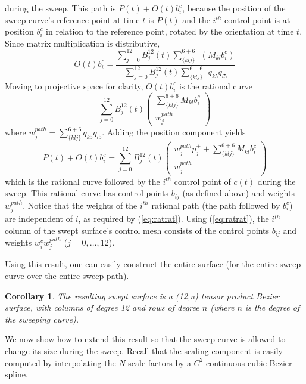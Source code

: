 \documentclass[times]{article}
\newcommand{\QED}{\vrule height 1.4ex width 1.0ex depth -.1ex\ } %
\newtheorem{corollary}{Corollary}[section]
\begin{document}
during the sweep.
This path is $P(t) + O(t)b_i^{c}$, because the position of the sweep
curve's reference point at time $t$ is $P(t)$ and the $i^{th}$ control
point is at position $b_i^c$ in relation to the reference point, rotated
by the orientation at time $t$.
Since matrix multiplication is distributive,
\[
	O(t)b_i^{c} = 
\frac{\sum_{j=0}^{12} B_j^{12}(t) \sum_{\{klj\}}^{6+6}
	\ \ (M_{kl} b_i^{c}) }
     {\sum_{j=0}^{12} B_j^{12}(t) \sum_{\{klj\}}^{6+6} 
	\ \ q_{k5}q_{l5}}
\]
Moving to projective space for clarity, 
$O(t)b_i^{c}$ is the rational curve
\[
	\sum_{j=0}^{12} B_j^{12}(t) 
	\left(	\begin{array}{c}
	\sum_{\{klj\}}^{6+6} M_{kl} b_i^{c} \\ w_j^{path}
	\end{array} \right)
\]
where $w_j^{path} = \sum_{\{klj\}}^{6+6} q_{k5} q_{l5}$.
Adding the position component yields
\[
P(t) + O(t)b_i^{c} = 
	\sum_{j=0}^{12} B_j^{12}(t) 
	\left(	\begin{array}{c}
	w_j^{path} p_j^{+} + \sum_{\{klj\}}^{6+6} M_{kl} b_i^{c} \\ 
	w_j^{path}
	\end{array} \right)
\]
which is the rational curve followed by the $i^{th}$ control point
of $c(t)$ during the sweep.
This rational curve has control points $b_{ij}$ (as defined above)
and weights $w_j^{path}$.
Notice that the weights of the $i^{th}$ rational path 
(the path followed by $b_i^c$) are 
independent of $i$, as required by (\ref{eq:ratrat}).
Using (\ref{eq:ratrat}), 
the $i^{th}$ column of the swept surface's control mesh consists
of the control points $b_{ij}$
and weights $w_i^{c} w_j^{path}$ ($j=0,\ldots,12$).
\QED

Using this result, one can easily construct the entire surface
(for the entire sweep curve over the entire sweep path).

\begin{corollary}
The resulting swept surface is a (12,n) tensor product Bezier surface,
with columns of degree 12 and rows of degree $n$
(where $n$ is the degree of the sweeping curve).
\end{corollary}

We now show how to extend this result so that the sweep curve
is allowed to change its size during the sweep.
Recall that the scaling component is easily computed by interpolating the
$N$ scale factors by a $C^2$-continuous cubic Bezier spline.
\end{document}
